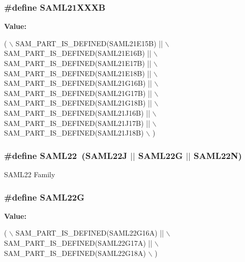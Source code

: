 \subsubsection[{S\+A\+M\+L21\+X\+X\+X\+B}]{\setlength{\rightskip}{0pt plus 5cm}\#define S\+A\+M\+L21\+X\+X\+X\+B}\label{group__sam__part__macros__group_ga8f1ce40088d4f4a65fe4e9c9f6785043}
{\bfseries Value\+:}
\begin{DoxyCode}
( \(\backslash\)
        SAM\_PART\_IS\_DEFINED(SAML21E15B) || \(\backslash\)
        SAM\_PART\_IS\_DEFINED(SAML21E16B) || \(\backslash\)
        SAM\_PART\_IS\_DEFINED(SAML21E17B) || \(\backslash\)
        SAM\_PART\_IS\_DEFINED(SAML21E18B) || \(\backslash\)
        SAM\_PART\_IS\_DEFINED(SAML21G16B) || \(\backslash\)
        SAM\_PART\_IS\_DEFINED(SAML21G17B) || \(\backslash\)
        SAM\_PART\_IS\_DEFINED(SAML21G18B) || \(\backslash\)
        SAM\_PART\_IS\_DEFINED(SAML21J16B) || \(\backslash\)
        SAM\_PART\_IS\_DEFINED(SAML21J17B) || \(\backslash\)
        SAM\_PART\_IS\_DEFINED(SAML21J18B) \(\backslash\)
    )
\end{DoxyCode}
\hypertarget{group__sam__part__macros__group_ga5f904618e9b88b4d9981d6a374b09aa5}{}
\subsubsection[{S\+A\+M\+L22}]{\setlength{\rightskip}{0pt plus 5cm}\#define S\+A\+M\+L22~(S\+A\+M\+L22\+J $\vert$$\vert$ S\+A\+M\+L22\+G $\vert$$\vert$ S\+A\+M\+L22\+N)}\label{group__sam__part__macros__group_ga5f904618e9b88b4d9981d6a374b09aa5}
S\+A\+M\+L22 Family \hypertarget{group__sam__part__macros__group_gab57f0f43cbe78f536576e04c9b237785}{}
\subsubsection[{S\+A\+M\+L22\+G}]{\setlength{\rightskip}{0pt plus 5cm}\#define S\+A\+M\+L22\+G}\label{group__sam__part__macros__group_gab57f0f43cbe78f536576e04c9b237785}
{\bfseries Value\+:}
\begin{DoxyCode}
( \(\backslash\)
        SAM\_PART\_IS\_DEFINED(SAML22G16A) || \(\backslash\)
        SAM\_PART\_IS\_DEFINED(SAML22G17A) || \(\backslash\)
        SAM\_PART\_IS\_DEFINED(SAML22G18A) \(\backslash\)
    )
\end{DoxyCode}
\hypertarget{group__sam__part__macros__group_ga88e5b2e7925ad798e0e6d099be6ac52d}{}
